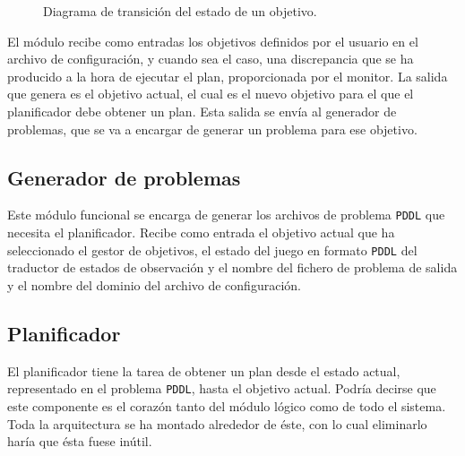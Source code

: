 \begin{figure}[H]
    \centering
    \caption{Diagrama de transición del estado de un objetivo.}
    \label{fig:goal_transition}
\end{figure}

El módulo recibe como entradas los objetivos definidos por el usuario en el archivo de configuración,
y cuando sea el caso, una discrepancia que se ha producido a la hora de ejecutar el plan, proporcionada
por el monitor. La salida que genera es el objetivo actual, el cual es el nuevo objetivo para el que
el planificador debe obtener un plan. Esta salida se envía al generador de problemas, que se va a encargar
de generar un problema para ese objetivo.

\subsection{Generador de problemas}

Este módulo funcional se encarga de generar los archivos de problema \texttt{PDDL} que necesita
el planificador. Recibe como entrada el objetivo actual que ha seleccionado el gestor de objetivos,
el estado del juego en formato \texttt{PDDL} del traductor de estados de observación y el nombre del
fichero de problema de salida y el nombre del dominio del archivo de configuración.

\subsection{Planificador}

El planificador tiene la tarea de obtener un plan desde el estado actual, representado en el problema
\texttt{PDDL}, hasta el objetivo actual. Podría decirse que este componente es el corazón tanto del módulo
lógico como de todo el sistema. Toda la arquitectura se ha montado alrededor de éste, con lo cual
eliminarlo haría que ésta fuese inútil.

